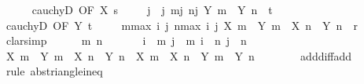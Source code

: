 \begin{isabellebody}
\ \ \ \ \isamarkupfalse%
\ cauchyD\ {\isacharbrackleft}{\kern0pt}OF\ X\ s{\isacharbrackright}{\kern0pt}\ \isacommand{{\isachardot}{\kern0pt}{\isachardot}{\kern0pt}}\isamarkupfalse%
\isanewline
\ \ \isamarkupfalse%
\ j\ \ j{\isacharcolon}{\kern0pt}\ {\isachardoublequoteopen}{\isasymforall}m{\isasymge}j{\isachardot}{\kern0pt}\ {\isasymforall}n{\isasymge}j{\isachardot}{\kern0pt}\ {\isasymbar}Y\ m\ {\isacharminus}{\kern0pt}\ Y\ n{\isasymbar}\ {\isacharless}{\kern0pt}\ t{\isachardoublequoteclose}\isanewline
\ \ \ \ \isamarkupfalse%
\ cauchyD\ {\isacharbrackleft}{\kern0pt}OF\ Y\ t{\isacharbrackright}{\kern0pt}\ \isacommand{{\isachardot}{\kern0pt}{\isachardot}{\kern0pt}}\isamarkupfalse%
\isanewline
\ \ \isamarkupfalse%
\ {\isachardoublequoteopen}{\isasymforall}m{\isasymge}max\ i\ j{\isachardot}{\kern0pt}\ {\isasymforall}n{\isasymge}max\ i\ j{\isachardot}{\kern0pt}\ {\isasymbar}{\isacharparenleft}{\kern0pt}X\ m\ {\isacharplus}{\kern0pt}\ Y\ m{\isacharparenright}{\kern0pt}\ {\isacharminus}{\kern0pt}\ {\isacharparenleft}{\kern0pt}X\ n\ {\isacharplus}{\kern0pt}\ Y\ n{\isacharparenright}{\kern0pt}{\isasymbar}\ {\isacharless}{\kern0pt}\ r{\isachardoublequoteclose}\isanewline
\ \ \isamarkupfalse%
\ clarsimp\isanewline
\ \ \ \ \isamarkupfalse%
\ m\ n\isanewline
\ \ \ \ \isamarkupfalse%
\ {\isacharasterisk}{\kern0pt}{\isacharcolon}{\kern0pt}\ {\isachardoublequoteopen}i\ {\isasymle}\ m{\isachardoublequoteclose}\ {\isachardoublequoteopen}j\ {\isasymle}\ m{\isachardoublequoteclose}\ {\isachardoublequoteopen}i\ {\isasymle}\ n{\isachardoublequoteclose}\ {\isachardoublequoteopen}j\ {\isasymle}\ n{\isachardoublequoteclose}\isanewline
\ \ \ \ \isamarkupfalse%
\ {\isachardoublequoteopen}{\isasymbar}{\isacharparenleft}{\kern0pt}X\ m\ {\isacharplus}{\kern0pt}\ Y\ m{\isacharparenright}{\kern0pt}\ {\isacharminus}{\kern0pt}\ {\isacharparenleft}{\kern0pt}X\ n\ {\isacharplus}{\kern0pt}\ Y\ n{\isacharparenright}{\kern0pt}{\isasymbar}\ {\isasymle}\ {\isasymbar}X\ m\ {\isacharminus}{\kern0pt}\ X\ n{\isasymbar}\ {\isacharplus}{\kern0pt}\ {\isasymbar}Y\ m\ {\isacharminus}{\kern0pt}\ Y\ n{\isasymbar}{\isachardoublequoteclose}\isanewline
\ \ \ \ \ \ \isamarkupfalse%
\ add{\isacharunderscore}{\kern0pt}diff{\isacharunderscore}{\kern0pt}add\ \isamarkupfalse%
\ {\isacharparenleft}{\kern0pt}rule\ abs{\isacharunderscore}{\kern0pt}triangle{\isacharunderscore}{\kern0pt}ineq{\isacharparenright}{\kern0pt}\isanewline

\end{isabellebody}
